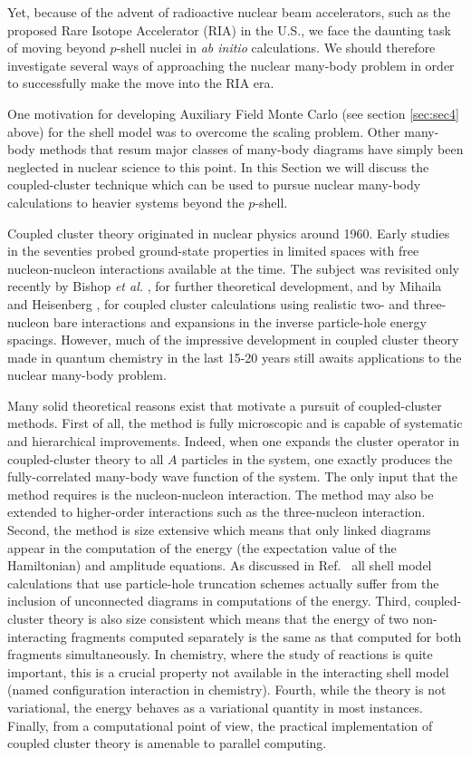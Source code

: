 \documentclass[twoside,12pt]{article}
\begin{document}
Yet, because of the advent of radioactive nuclear beam
accelerators, such as the proposed Rare Isotope Accelerator (RIA) in the
U.S., we face the daunting task of moving beyond
$p$-shell nuclei in {\em ab initio} calculations. We should therefore
investigate several ways of approaching the nuclear many-body 
problem in order to successfully make the move into the RIA era.

One motivation for developing 
Auxiliary Field Monte Carlo (see section \ref{sec:sec4} above) for the shell model was 
to overcome the scaling problem. Other many-body 
methods that resum major classes of many-body diagrams have simply
been neglected in nuclear science to this point. 
In this Section we will discuss the coupled-cluster 
technique which can be used to pursue nuclear many-body calculations to 
heavier systems beyond the $p$-shell. 

Coupled cluster theory originated in nuclear physics
\cite{coester58,coester60} around 1960.  Early studies in the
seventies \cite{klz78} probed ground-state properties in limited
spaces with free nucleon-nucleon interactions available at the
time. The subject was revisited
only recently by Bishop {\it et al.}
\cite{ticcm}, for further theoretical development, and by Mihaila and
Heisenberg \cite{hm99}, for coupled cluster calculations
using realistic
two- and three-nucleon
bare interactions
and expansions in the
inverse particle-hole energy spacings.
However, much of
the impressive development in
coupled cluster theory made in quantum chemistry in
the last 15-20 years
\cite{comp_chem_rev00,Bartlett95,Paldus99,Piecuch02a,Piecuch02b}
still awaits applications to the nuclear many-body problem.

Many solid theoretical reasons exist that motivate a pursuit of
coupled-cluster methods. First of all, the method is fully
microscopic and is capable of systematic and hierarchical improvements.
Indeed, when one expands the cluster operator in coupled-cluster theory
to all $A$ particles in the system, one exactly produces the fully-correlated
many-body wave function of the system. The only input that the method
requires is the nucleon-nucleon interaction. 
The method may also be extended
to higher-order interactions such as the three-nucleon interaction.
Second, the method is size extensive which means that only linked
diagrams appear in the computation of the  
energy (the expectation value of the Hamiltonian) and amplitude equations.
As discussed in Ref.~\cite{comp_chem_rev00} all shell model calculations
that use particle-hole truncation schemes
actually suffer from the inclusion of unconnected diagrams
in computations of the energy.
Third, coupled-cluster theory is also size
consistent which means that the energy of two non-interacting fragments
computed separately is the same as that computed for both fragments
simultaneously. In chemistry, where the study of reactions
is quite important, this is a crucial property not available
in the interacting shell model (named configuration interaction in
chemistry).
Fourth, while the theory
is not variational,
the energy behaves as a variational quantity in most instances.
Finally, from a
computational point of view, the practical implementation of coupled
cluster theory is amenable to parallel computing.
\end{document}
